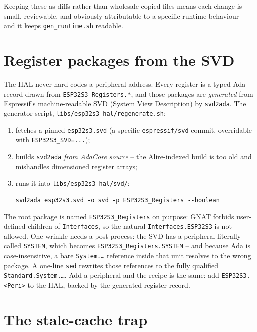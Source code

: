 Keeping these as diffs rather than wholesale copied files means each change is
small, reviewable, and obviously attributable to a specific runtime behaviour --
and it keeps \texttt{gen\_runtime.sh} readable.

\section{Register packages from the SVD}

The HAL never hard-codes a peripheral address. Every register is a typed Ada
record drawn from \texttt{ESP32S3\_Registers.*}, and those packages are
\emph{generated} from Espressif's machine-readable SVD (System View Description)
by \texttt{svd2ada}. The generator script,
\texttt{libs/esp32s3\_hal/regenerate.sh}:

\begin{enumerate}
\item fetches a pinned \texttt{esp32s3.svd} (a specific \texttt{espressif/svd}
  commit, overridable with \texttt{ESP32S3\_SVD=...});
\item builds \texttt{svd2ada} \emph{from AdaCore source} -- the Alire-indexed
  build is too old and mishandles dimensioned register arrays;
\item runs it into \texttt{libs/esp32s3\_hal/svd/}:
\begin{lstlisting}[style=sh]
svd2ada esp32s3.svd -o svd -p ESP32S3_Registers --boolean
\end{lstlisting}
\end{enumerate}

The root package is named \texttt{ESP32S3\_Registers} on purpose: GNAT forbids
user-defined children of \texttt{Interfaces}, so the natural
\texttt{Interfaces.ESP32S3} is not allowed. One wrinkle needs a post-process:
the SVD has a peripheral literally called \texttt{SYSTEM}, which becomes
\texttt{ESP32S3\_Registers.SYSTEM} -- and because Ada is case-insensitive, a
bare \texttt{System.\dots} reference inside that unit resolves to the wrong
package. A one-line \texttt{sed} rewrites those references to the fully qualified
\texttt{Standard.System.\dots}. Add a peripheral and the recipe is the same: add
\texttt{ESP32S3.<Peri>} to the HAL, backed by the generated register record.

\section{The stale-cache trap}
\label{sec:stale-cache}

